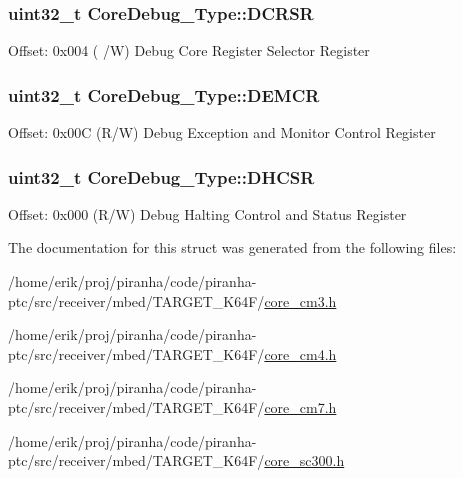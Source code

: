 \subsubsection[{\texorpdfstring{D\+C\+R\+SR}{DCRSR}}]{ uint32\+\_\+t Core\+Debug\+\_\+\+Type\+::\+D\+C\+R\+SR}\hypertarget{structCoreDebug__Type_afefa84bce7497652353a1b76d405d983}{}\label{structCoreDebug__Type_afefa84bce7497652353a1b76d405d983}
Offset\+: 0x004 ( /W) Debug Core Register Selector Register 
\subsubsection[{\texorpdfstring{D\+E\+M\+CR}{DEMCR}}]{ uint32\+\_\+t Core\+Debug\+\_\+\+Type\+::\+D\+E\+M\+CR}\hypertarget{structCoreDebug__Type_a5cdd51dbe3ebb7041880714430edd52d}{}\label{structCoreDebug__Type_a5cdd51dbe3ebb7041880714430edd52d}
Offset\+: 0x00C (R/W) Debug Exception and Monitor Control Register 
\subsubsection[{\texorpdfstring{D\+H\+C\+SR}{DHCSR}}]{ uint32\+\_\+t Core\+Debug\+\_\+\+Type\+::\+D\+H\+C\+SR}\hypertarget{structCoreDebug__Type_a25c14c022c73a725a1736e903431095d}{}\label{structCoreDebug__Type_a25c14c022c73a725a1736e903431095d}
Offset\+: 0x000 (R/W) Debug Halting Control and Status Register 

The documentation for this struct was generated from the following files\+:\begin{DoxyCompactItemize}
\item 
/home/erik/proj/piranha/code/piranha-\/ptc/src/receiver/mbed/\+T\+A\+R\+G\+E\+T\+\_\+\+K64\+F/\hyperlink{core__cm3_8h}{core\+\_\+cm3.\+h}\item 
/home/erik/proj/piranha/code/piranha-\/ptc/src/receiver/mbed/\+T\+A\+R\+G\+E\+T\+\_\+\+K64\+F/\hyperlink{core__cm4_8h}{core\+\_\+cm4.\+h}\item 
/home/erik/proj/piranha/code/piranha-\/ptc/src/receiver/mbed/\+T\+A\+R\+G\+E\+T\+\_\+\+K64\+F/\hyperlink{core__cm7_8h}{core\+\_\+cm7.\+h}\item 
/home/erik/proj/piranha/code/piranha-\/ptc/src/receiver/mbed/\+T\+A\+R\+G\+E\+T\+\_\+\+K64\+F/\hyperlink{core__sc300_8h}{core\+\_\+sc300.\+h}\end{DoxyCompactItemize}
